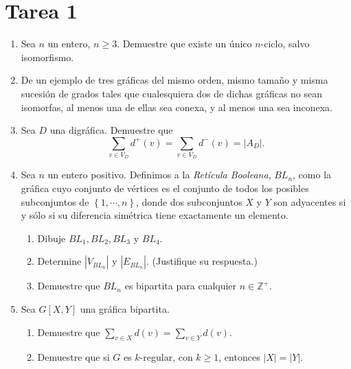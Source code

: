 \documentclass{article}
\newcommand{\set}[1]{%
\left\{ #1 \right\}%
}
\begin{document}
\section*{\LARGE{Tarea 1}}

\begin{enumerate}

  \item Sea $n$ un entero, $n \ge 3$.   Demuestre que existe un \'unico
    $n$-ciclo, salvo isomorfismo.

  \item De un ejemplo de tres gr\'aficas del mismo orden, mismo tama\~no y misma
    sucesi\'on de grados tales que cualesquiera dos de dichas gr\'aficas no sean
    isomorfas, al menos una de ellas sea conexa, y al menos una sea inconexa.

  \item Sea $D$ una digr\'afica.   Demuestre que
    $$\sum_{v \in V_D} d^+(v) = \sum_{v \in V_D} d^-(v) = |A_D|.$$

  \item  Sea $n$ un entero positivo. Definimos a la {\em Ret\'icula Booleana},
    $BL_n$, como la gr\'afica cuyo conjunto de vértices es el conjunto de todos
    los posibles subconjuntos de $\set{1, \cdots, n}$, donde dos subconjuntos
    $X$ y $Y$ son adyacentes si y s\'olo si su diferencia sim\'etrica tiene
    exactamente un elemento.
    \begin{enumerate}
      \item Dibuje $BL_1, BL_2, BL_3$ y $BL_4$.

      \item Determine $|V_{BL_n}|$ y $|E_{BL_n}|$. (Justifique su respuesta.)

      \item Demuestre que $BL_n$ es bipartita para cualquier $n \in
        \mathbb{Z}^+$.
    \end{enumerate}


  \item Sea $G[X, Y]$ una gr\'afica bipartita.
    \begin{enumerate}
      \item Demuestre que $\sum_{v \in X} d(v) = \sum_{v \in Y} d(v)$.

      \item Demuestre que si $G$ es $k$-regular, con $k \ge 1$, entonces $|X| =
        |Y|$.
    \end{enumerate}

\end{enumerate}
\end{document}
